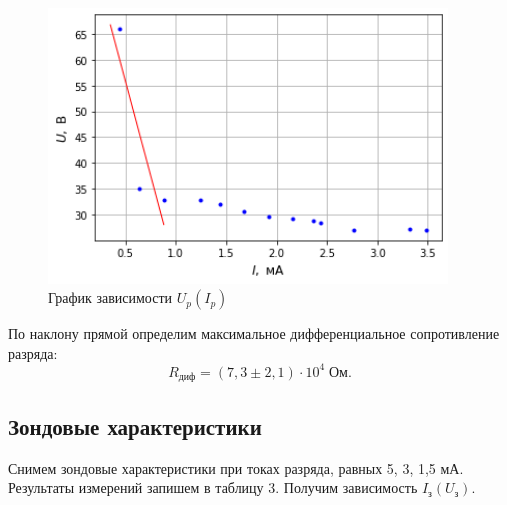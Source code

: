 \documentclass[a4paper]{article}
\theoremstyle{definition}
\theoremstyle{remark}
\begin{document}
    \begin{figure}[h!]
        \centering
        \includegraphics[width = 300pt]{image/graph2.png}
        \caption{График зависимости $U_p(I_p)$}
    \end{figure}

    По наклону прямой определим максимальное дифференциальное сопротивление разряда: $$R_{\text{диф}} = (7,3 \pm 2,1)\cdot 10^4 \; \text{Ом}.$$

    \subsection{Зондовые характеристики}

    Снимем зондовые характеристики при токах разряда, равных 5, 3, 1,5 мА. Результаты измерений запишем в таблицу 3. Получим зависимость $I_{\text{з}}(U_{\text{з}})$.
\end{document}

